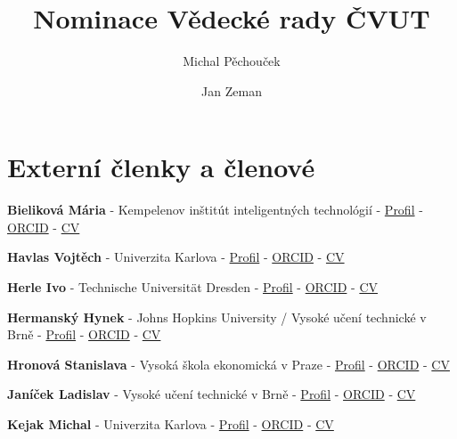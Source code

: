 \documentclass[11pt,a4paper]{article}
\title{Nominace Vědecké rady ČVUT}
\author{Michal Pěchouček \and Jan Zeman}
\date{}
\newcommand{\memberComplete}[5]{%
  \item \textbf{#1} - #2 - \href{#3}{Profil} - \href{#4}{ORCID} - \href{#5}{CV}
}
\begin{document}
\maketitle

\thispagestyle{fancy}

\tableofcontents

\section{Externí členky a členové}

\begin{memberlist}

\memberComplete{Bieliková Mária}
{Kempelenov inštitút inteligentných technológií}
{https://scholar.google.com/citations?user=wGB6dnEAAAAJ}
{https://orcid.org/0000-0003-4105-3494}
{https://drive.google.com/open?id=1luBCKkmRd8ekbdL-Ke5XLfs-SQKXpgoW}

\memberComplete{Havlas Vojtěch}
{Univerzita Karlova}
{https://pubmed.ncbi.nlm.nih.gov/?term=Havlas+V\&cauthor_id=15456100}
{https://orcid.org/0000-0002-2974-5511}
{https://drive.google.com/open?id=1YGfpWf0Qgs1fYiGpoZCf3PQycjm9fNcg}

\memberComplete{Herle Ivo}
{Technische Universität Dresden}
{https://scholar.google.com/citations?user=PKjVHWsAAAAJ}
{https://orcid.org/0000-0002-9222-3361}
{https://drive.google.com/open?id=1mnGITNeehYKY0F57Cy1uCuAop3DIjP1M}

\memberComplete{Hermanský Hynek}
{Johns Hopkins University / Vysoké učení technické v Brně}
{https://scholar.google.com/citations?user=XrYcfFQAAAAJ}
{https://orcid.org/0000-0001-8032-4811}
{https://drive.google.com/open?id=1CeS3svvLdfGW4I1frc8GJsUR3O6F2qGf}

\memberComplete{Hronová Stanislava}
{Vysoká škola ekonomická v Praze}
{https://cs.wikipedia.org/wiki/Stanislava_Hronov\%C3\%A1}
{https://orcid.org/0000-0002-3568-9755}
{https://drive.google.com/open?id=1guVDHTNC8pBExj0FcD6hJL4XiXVriKAU}

\memberComplete{Janíček Ladislav}
{Vysoké učení technické v Brně}
{https://cs.wikipedia.org/wiki/Ladislav_Jan\%C3\%AD\%C4\%8Dek}
{https://orcid.org/0000-0002-8364-7568}
{https://drive.google.com/open?id=1LcxL1JDcQ_WgiBFXV7I-g0U-Q8YNfiVx}

\memberComplete{Kejak Michal}
{Univerzita Karlova}
{https://scholar.google.com/citations?user=JK1ZLaMAAAAJ}
{https://orcid.org/0000-0001-5593-4263}
{https://drive.google.com/open?id=15kJ41X2YS1sOsY7GelN5FYFnPZBpES58}


\end{memberlist}
\end{document}
